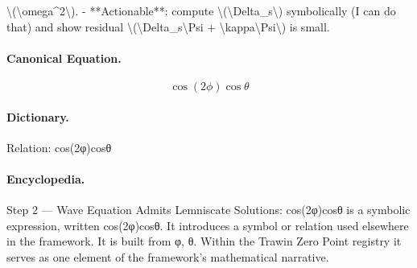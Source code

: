 \textbackslash{}(\textbackslash{}omega\textasciicircum{}2\textbackslash{}). - **Actionable**: compute \textbackslash{}(\textbackslash{}Delta\_s\textbackslash{}) symbolically (I can do that) and show residual \textbackslash{}(\textbackslash{}Delta\_s\textbackslash{}Psi + \textbackslash{}kappa\textbackslash{}Psi\textbackslash{}) is small.

\paragraph{Canonical Equation.}
\[
\cos(2\phi)\cos\theta
\]

\paragraph{Dictionary.}
Relation: cos(2φ)cosθ

\paragraph{Encyclopedia.}
Step 2 — Wave Equation Admits Lemniscate Solutions: cos(2φ)cosθ is a symbolic expression, written cos(2φ)cosθ. It introduces a symbol or relation used elsewhere in the framework. It is built from φ, θ. Within the Trawin Zero Point registry it serves as one element of the framework's mathematical narrative.
